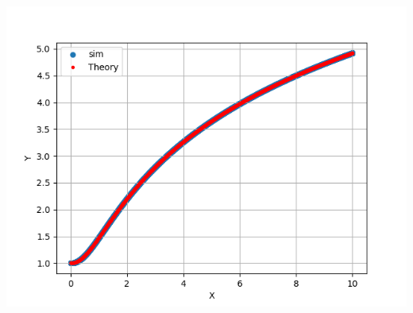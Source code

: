\documentclass[journal]{IEEEtran}
\begin{document}
\begin{center}
    \includegraphics[width=0.75\columnwidth]{fig/fig.png}
\end{center}
\end{document}
